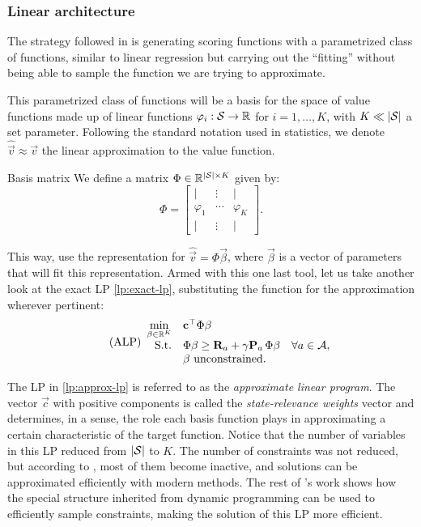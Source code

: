 \subsubsection{Linear architecture}
The strategy followed in \cite{farias2002thesis} is generating scoring functions
with a pa\-ra\-me\-trized class of functions, similar to linear regression but
carrying out the ``fitting'' without being able to sample the function we are
trying to approximate.

This parametrized class of functions will be a basis for the space of value
functions made up of linear functions $\varphi_i : \mathcal{S} \to \mathbb{R}$ for $i = 1,
\dots, K$, with $K \ll |\mathcal{S}|$ a set parameter. Following the standard
notation used in statistics, we denote $\widehat{\vec{v}} \approx \vec{v}$ the
linear approximation to the value function.

\begin{dfn}{Basis matrix}{}
    We define a matrix $\Phi \in \mathbb{R}^{|\mathcal{S}| \times K}$ given by:
    \[
        \Phi =
        \begin{bmatrix}
            | & \vdots & | \\
            \varphi_1 & \cdots & \varphi_K \\
            | & \vdots & |
        \end{bmatrix}.
    \]
\end{dfn}

This way, use the representation for $\widehat{\vec{v}} = \Phi \vec{\beta}$,
where $\vec{\beta}$ is a vector of parameters that will fit this representation.
Armed with this one last tool, let us take another look at the exact LP
\eqref{lp:exact-lp}, substituting the function for the approximation wherever
pertinent:
\begin{equation}
\label{lp:approx-lp}
\tag{ALP}
\begin{array}{rl@{}ll}
    \displaystyle \min_{\vec{\beta} \in \R^{K}} & \vec{c}^{\top} \Phi \vec{\beta} \\
    \text{S.t.} & \displaystyle \Phi \vec{\beta} \geq \vec{R}_a + \gamma \vec{P}_a \, \Phi \vec{\beta} & \quad \forall a \in \Actions, \\
    & \vec{\beta} \text{ unconstrained}.
\end{array}
\end{equation}

The LP in \eqref{lp:approx-lp} is referred to as the \textit{approximate linear
program}. The vector $\vec{c}$ with positive components is called the
\emph{state-relevance weights} vector and determines, in a sense, the role each
basis function plays in approximating a certain characteristic of the target
function. Notice that the number of variables in this LP reduced from
$|\mathcal{S}|$ to $K$. The number of constraints was not reduced, but according to
\cite{farias2002thesis}, most of them become inactive, and solutions can be
approximated efficiently with modern methods. The rest of
\citeauthor{farias2002thesis}'s work shows how the special structure inherited
from dynamic programming can be used to efficiently sample constraints, making
the solution of this LP more efficient.

